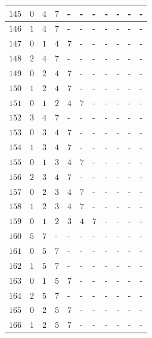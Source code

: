 \begin{appendices}
\begin{table}[H]
\begin{tabular} {|l|l|l|l|l|l|l|l|l|l|l|}
  		$ 145 $ & $ 0 $ &$ 4 $ &$ 7 $ & - &  - &  - &  - &  - &  - &  -   \\ \hline
  		$ 146 $ & $ 1 $ &$ 4 $ &$ 7 $ & - &  - &  - &  - &  - &  - &  -   \\ \hline
  		$ 147 $ & $ 0 $ &$ 1 $ &$ 4 $ &$ 7 $ & - &  - &  - &  - &  - &  -   \\ \hline
  		$ 148 $ & $ 2 $ &$ 4 $ &$ 7 $ & - &  - &  - &  - &  - &  - &  -   \\ \hline
  		$ 149 $ & $ 0 $ &$ 2 $ &$ 4 $ &$ 7 $ & - &  - &  - &  - &  - &  -   \\ \hline
  		$ 150 $ & $ 1 $ &$ 2 $ &$ 4 $ &$ 7 $ & - &  - &  - &  - &  - &  -   \\ \hline
  		$ 151 $ & $ 0 $ &$ 1 $ &$ 2 $ &$ 4 $ &$ 7 $ & - &  - &  - &  - &  -   \\ \hline
  		$ 152 $ & $ 3 $ &$ 4 $ &$ 7 $ & - &  - &  - &  - &  - &  - &  -   \\ \hline
  		$ 153 $ & $ 0 $ &$ 3 $ &$ 4 $ &$ 7 $ & - &  - &  - &  - &  - &  -   \\ \hline
  		$ 154 $ & $ 1 $ &$ 3 $ &$ 4 $ &$ 7 $ & - &  - &  - &  - &  - &  -   \\ \hline
  		$ 155 $ & $ 0 $ &$ 1 $ &$ 3 $ &$ 4 $ &$ 7 $ & - &  - &  - &  - &  -   \\ \hline
  		$ 156 $ & $ 2 $ &$ 3 $ &$ 4 $ &$ 7 $ & - &  - &  - &  - &  - &  -   \\ \hline
  		$ 157 $ & $ 0 $ &$ 2 $ &$ 3 $ &$ 4 $ &$ 7 $ & - &  - &  - &  - &  -   \\ \hline
  		$ 158 $ & $ 1 $ &$ 2 $ &$ 3 $ &$ 4 $ &$ 7 $ & - &  - &  - &  - &  -   \\ \hline
  		$ 159 $ & $ 0 $ &$ 1 $ &$ 2 $ &$ 3 $ &$ 4 $ &$ 7 $ & - &  - &  - &  -   \\ \hline
  		$ 160 $ & $ 5 $ &$ 7 $ & - &  - &  - &  - &  - &  - &  - &  -   \\ \hline
  		$ 161 $ & $ 0 $ &$ 5 $ &$ 7 $ & - &  - &  - &  - &  - &  - &  -   \\ \hline
  		$ 162 $ & $ 1 $ &$ 5 $ &$ 7 $ & - &  - &  - &  - &  - &  - &  -   \\ \hline
  		$ 163 $ & $ 0 $ &$ 1 $ &$ 5 $ &$ 7 $ & - &  - &  - &  - &  - &  -   \\ \hline
  		$ 164 $ & $ 2 $ &$ 5 $ &$ 7 $ & - &  - &  - &  - &  - &  - &  -   \\ \hline
  		$ 165 $ & $ 0 $ &$ 2 $ &$ 5 $ &$ 7 $ & - &  - &  - &  - &  - &  -   \\ \hline
  		$ 166 $ & $ 1 $ &$ 2 $ &$ 5 $ &$ 7 $ & - &  - &  - &  - &  - &  -   \\ \hline

\end{tabular}
\end{table}
\end{appendices}
